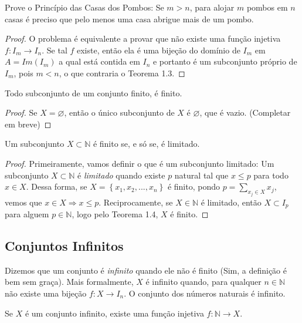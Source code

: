 \begin{prob}
Prove o Princípio das Casas dos Pombos: Se $m>n$, para alojar $m$ pombos em $n$ casas é preciso que pelo menos uma casa abrigue mais de um pombo.
\end{prob}

\begin{proof}
O problema é equivalente a provar que não existe uma função injetiva $f: I_{m} \rightarrow I_{n}$. Se tal $f$ existe, então ela é uma bijeção do domínio de $I_{m}$ em $A=Im(I_{m})$ a qual está contida em $I_{n}$ e portanto é um subconjunto próprio de $I_{m}$, pois $m <n$, o que contraria o Teorema 1.3.
\end{proof}
\begin{theorem}
Todo subconjunto de um conjunto finito, é finito.
\end{theorem}

\begin{proof}
Se $X=\varnothing$, então o único subconjunto de $X$ é $\varnothing$, que é vazio.  (Completar em breve)
\end{proof}

\begin{corol}
Um subconjunto $X \subset \mathbb{N}$ é finito se, e só se, é limitado.
\end{corol}
\begin{proof}
Primeiramente, vamos definir o que é um subconjunto limitado: Um subconjunto $X \subset \mathbb{N}$ é \textit{limitado} quando existe $p$ natural tal que $x \leq p$ para todo $x \in X$. Dessa forma, se $X=\left \{ x_{1},x_{2},...,x_{n} \right \}$ é finito, pondo $p=\sum_{x_{j}\in X}^{}x_{j}$, vemos que $x\in X\Rightarrow x\leq p$. Reciprocamente, se $X \in \mathbb{N}$ é limitado, então $X \subset I_{p}$ para alguem $p \in \mathbb{N}$, logo pelo Teorema 1.4, $X$ é finito.
\end{proof}

\subsection{Conjuntos Infinitos}
Dizemos que um conjunto é \textit{infinito} quando ele não é finito (Sim, a definição é bem sem graça). Mais formalmente, $X$ é infinito quando, para qualquer $n \in \mathbb{N}$ não existe uma bijeção $f:X \rightarrow I_{n}$. O conjunto dos números naturais é infinito.

\begin{theorem}
Se $X$ é um conjunto infinito, existe uma função injetiva $f: \mathbb{N} \rightarrow X$.
\end{theorem}

